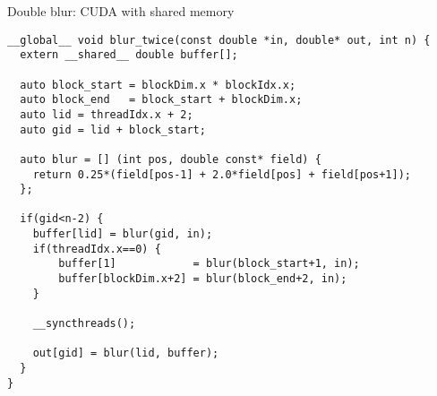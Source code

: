 \documentclass[aspectratio=43]{beamer}
\begin{document}
\begin{frame}[fragile]{}
    \begin{code}{Double blur: CUDA with shared memory}
        \begin{lstlisting}[style=boxcudatiny]
__global__ void blur_twice(const double *in, double* out, int n) {
  extern __shared__ double buffer[];

  auto block_start = blockDim.x * blockIdx.x;
  auto block_end   = block_start + blockDim.x;
  auto lid = threadIdx.x + 2;
  auto gid = lid + block_start;

  auto blur = [] (int pos, double const* field) {
    return 0.25*(field[pos-1] + 2.0*field[pos] + field[pos+1]);
  };

  if(gid<n-2) {
    buffer[lid] = blur(gid, in);
    if(threadIdx.x==0) {
        buffer[1]            = blur(block_start+1, in);
        buffer[blockDim.x+2] = blur(block_end+2, in);
    }

    __syncthreads();

    out[gid] = blur(lid, buffer);
  }
}
        \end{lstlisting}
    \end{code}
\end{frame}
\end{document}
